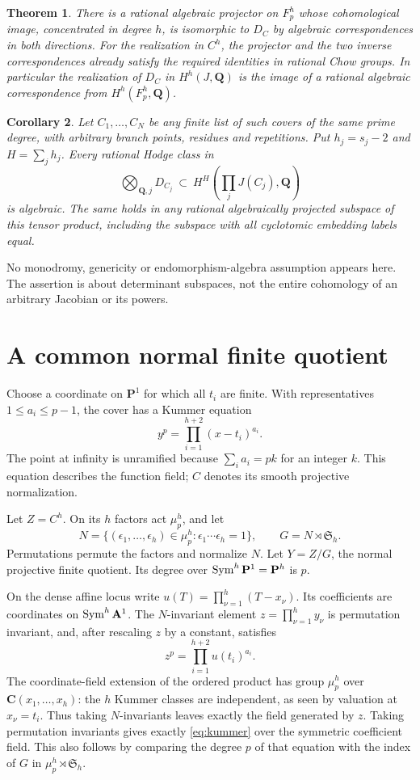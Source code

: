 \documentclass[11pt]{article}
\newtheorem{theorem}{Theorem}[section]
\newtheorem{corollary}[theorem]{Corollary}
\theoremstyle{remark}\newtheorem{remark}[theorem]{Remark}
\newcommand{\Q}{\mathbf Q}\newcommand{\C}{\mathbf C}
\begin{document}
\begin{theorem}\label{thm:transfer}
There is a rational algebraic projector on $F_p^h$ whose cohomological
image, concentrated in degree $h$, is isomorphic to $D_C$ by algebraic
correspondences in both directions. For the realization in $C^h$, the
projector and the two inverse correspondences already satisfy the required
identities in rational Chow groups. In particular the realization of $D_C$
in $H^h(J,\Q)$ is the image of a rational algebraic correspondence from
$H^h(F_p^h,\Q)$.
\end{theorem}

\begin{corollary}\label{cor:products}
Let $C_1,\ldots,C_N$ be any finite list of such covers of the same prime
degree, with arbitrary branch points, residues and repetitions. Put
$h_j=s_j-2$ and $H=\sum_jh_j$. Every rational Hodge class in
\[
 \bigotimes_{\Q,j}D_{C_j}
 \ \subset\ H^H\left(\prod_jJ(C_j),\Q\right)
\]
is algebraic. The same holds in any rational algebraically projected
subspace of this tensor product, including the subspace with all
cyclotomic embedding labels equal.
\end{corollary}

No monodromy, genericity or endomorphism-algebra assumption appears here.
The assertion is about determinant subspaces, not the entire cohomology
of an arbitrary Jacobian or its powers.

\section{A common normal finite quotient}
Choose a coordinate on $\mathbf P^1$ for which all $t_i$ are finite.
With representatives $1\leq a_i\leq p-1$, the cover has a Kummer equation
\[
 y^p=\prod_{i=1}^{h+2}(x-t_i)^{a_i}.
\]
The point at infinity is unramified because $\sum_i a_i=pk$ for an integer
$k$. This equation describes the function field; $C$ denotes its smooth
projective normalization.

Let $Z=C^h$. On its $h$ factors act $\mu_p^h$, and let
\[
 N=\{(\epsilon_1,\ldots,\epsilon_h)\in\mu_p^h:
             \epsilon_1\cdots\epsilon_h=1\},\qquad
 G=N\rtimes\mathfrak S_h.
\]
Permutations permute the factors and normalize $N$. Let $Y=Z/G$, the
normal projective finite quotient. Its degree over
$\operatorname{Sym}^h\mathbf P^1=\mathbf P^h$ is $p$.

On the dense affine locus write
$u(T)=\prod_{\nu=1}^h(T-x_\nu)$. Its coefficients are coordinates on
$\operatorname{Sym}^h\mathbf A^1$. The $N$-invariant element
$z=\prod_{\nu=1}^h y_\nu$ is permutation invariant, and, after rescaling
$z$ by a constant, satisfies
\begin{equation}\label{eq:kummer}
 z^p=\prod_{i=1}^{h+2}u(t_i)^{a_i}.
\end{equation}
The coordinate-field extension of the ordered product has group
$\mu_p^h$ over $\C(x_1,\ldots,x_h)$: the $h$ Kummer classes are independent,
as seen by valuation at $x_\nu=t_i$. Thus taking $N$-invariants leaves
exactly the field generated by $z$. Taking permutation invariants gives
exactly \eqref{eq:kummer} over the symmetric coefficient field. This
also follows by comparing the degree $p$ of that equation with the index
of $G$ in $\mu_p^h\rtimes\mathfrak S_h$.
\end{document}
